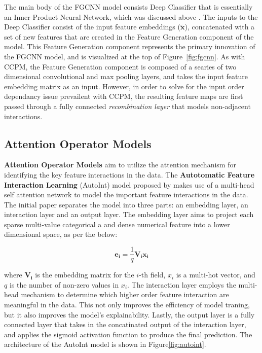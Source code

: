 \documentclass{mldsmsc}
\begin{document}
The main body of the FGCNN model consists Deep Classifier that is essentially an Inner Product
Neural Network, which was discussed above \citep{RefWorks:qu2018product-based}. The inputs
to the Deep Classifier consist of the input feature embeddings ($\tilde{\mathbf{x}}$), concatenated
with a set of new features that are created in the Feature Generation component of the model. This
Feature Generation component represents the primary innovation of the FGCNN model, and is visualized
at the top of Figure~\ref{fig:fgcnn}. As with CCPM, the Feature Generation component is composed of
a searies of two dimensional convolutional and max pooling layers, and takes the input feature
embedding matrix as an input. However, in order to solve for the input order dependancy issue
prevailent with CCPM, the resulting feature maps are first passed through a fully connected \emph{recombination layer}
that models non-adjacent interactions.

\subsection{Attention Operator Models}

\textbf{Attention Operator Models} aim to utilize the attention mechanism for identifying
the key feature interactions in the data. The \textbf{Autotomatic Feature Interaction Learning} (AutoInt) 
model proposed by \cite{RefWorks:song2019autoint} makes use of a multi-head self attention
network to model the important feature interactions in the data. The initial 
paper separates the model into three parts: an embedding layer, an interaction layer 
and an output layer. The embedding layer aims to project each sparse multi-value
categorical a and dense numerical feature into a lower dimensional space, as per the below:

$$
\mathbf{e_i} = \frac{1}{q} \mathbf{V_i x_i}
$$

where $\mathbf{V_i}$ is the embedding matrix for the $i$-th field, $x_i$ is a multi-hot vector, and $q$ 
is the number of non-zero values in $x_i$. The interaction layer employs the multi-head
mechanism to determine which higher order feature interaction are meaningful in the data. This not only
improves the efficiency of model traning, but it also improves the model's explainability. Lastly,
the output layer is a fully connected layer that takes in the concatinated output 
of the interaction layer, and applies the sigmoid activation function to produce the final prediction.
The architecture of the AutoInt model is shown in Figure\ref{fig:autoint}.
\end{document}
